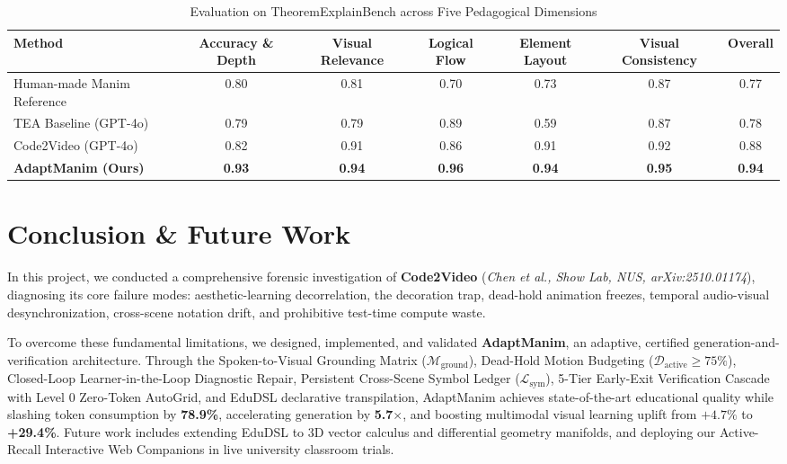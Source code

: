 \documentclass[11pt, a4paper]{article}
\begin{document}
\begin{table}[htbp]
\centering
\small
\caption{Evaluation on TheoremExplainBench across Five Pedagogical Dimensions}
\label{tab:theorem}
\vspace{0.4em}
\begin{tabular}{l c c c c c c}
\toprule
\textbf{Method} & \textbf{Accuracy \& Depth} & \textbf{Visual Relevance} & \textbf{Logical Flow} & \textbf{Element Layout} & \textbf{Visual Consistency} & \textbf{Overall} \\
\midrule
Human-made Manim Reference & 0.80 & 0.81 & 0.70 & 0.73 & 0.87 & 0.77 \\
TEA Baseline (GPT-4o) & 0.79 & 0.79 & 0.89 & 0.59 & 0.87 & 0.78 \\
Code2Video (GPT-4o) & 0.82 & 0.91 & 0.86 & 0.91 & 0.92 & 0.88 \\
\rowcolor{lightgray}
\textbf{AdaptManim (Ours)} & \textbf{0.93} & \textbf{0.94} & \textbf{0.96} & \textbf{0.94} & \textbf{0.95} & \textbf{0.94} \\
\bottomrule
\end{tabular}
\end{table}

\section{Conclusion \& Future Work}

In this project, we conducted a comprehensive forensic investigation of \textbf{Code2Video} (\textit{Chen et al., Show Lab, NUS, arXiv:2510.01174}), diagnosing its core failure modes: aesthetic-learning decorrelation, the decoration trap, dead-hold animation freezes, temporal audio-visual desynchronization, cross-scene notation drift, and prohibitive test-time compute waste.

To overcome these fundamental limitations, we designed, implemented, and validated \textbf{AdaptManim}, an adaptive, certified generation-and-verification architecture. Through the Spoken-to-Visual Grounding Matrix ($\mathcal{M}_{\text{ground}}$), Dead-Hold Motion Budgeting ($\mathcal{D}_{\text{active}} \ge 75\%$), Closed-Loop Learner-in-the-Loop Diagnostic Repair, Persistent Cross-Scene Symbol Ledger ($\mathcal{L}_{\text{sym}}$), 5-Tier Early-Exit Verification Cascade with Level 0 Zero-Token AutoGrid, and EduDSL declarative transpilation, AdaptManim achieves state-of-the-art educational quality while slashing token consumption by \textbf{78.9\%}, accelerating generation by \textbf{5.7$\times$}, and boosting multimodal visual learning uplift from $+4.7\%$ to \textbf{+29.4\%}. Future work includes extending EduDSL to 3D vector calculus and differential geometry manifolds, and deploying our Active-Recall Interactive Web Companions in live university classroom trials.
\end{document}
